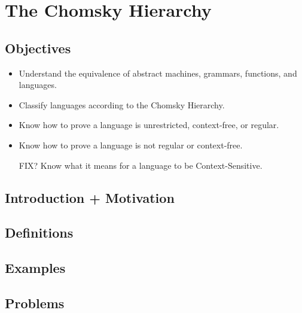 \chapter{The Chomsky Hierarchy}

\section{Objectives}

\begin{itemize}
	\item Understand the equivalence of abstract machines, grammars, functions, and languages.
	\item Classify languages according to the Chomsky Hierarchy.
	\item Know how to prove a language is unrestricted, context-free, or regular.
	\item Know how to prove a language is not regular or context-free.
	\item [FIX?] Know what it means for a language to be Context-Sensitive.
\end{itemize}

\section{Introduction + Motivation}

\section{Definitions}

\section{Examples}

\section{Problems}